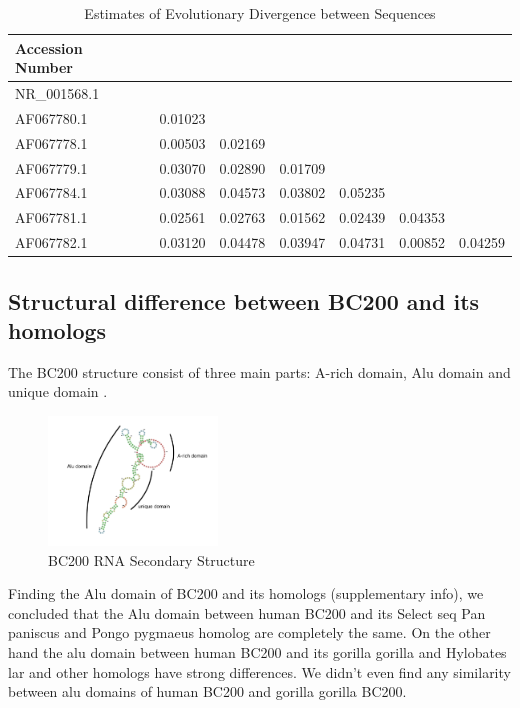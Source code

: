 \documentclass[conference, 11pt]{IEEEtran}
\begin{document}
\begin{table}[h]
  \centering
  \caption{Estimates of Evolutionary Divergence between Sequences}
  \label{tbl:distances}
  \begin{tabular}{lcccccc}
    \toprule
    Accession Number \\
    \midrule
    NR\_001568.1 \\
    AF067780.1 & 0.01023 \\
    AF067778.1 & 0.00503 & 0.02169 \\
    AF067779.1 & 0.03070 & 0.02890 & 0.01709 \\ 
    AF067784.1 & 0.03088 & 0.04573 & 0.03802 & 0.05235 \\
    AF067781.1 & 0.02561 & 0.02763 & 0.01562 & 0.02439 & 0.04353 \\ 
    AF067782.1 & 0.03120 & 0.04478 & 0.03947 & 0.04731 & 0.00852 & 0.04259 \\
    \bottomrule
  \end{tabular}
\end{table}

\subsection{Structural difference between BC200 and its homologs}\label{sec:results-structure}

The BC200 structure consist of three main parts: A-rich domain, Alu domain and unique domain \cite{jung2014rna}.

\begin{figure}[h]
  \centering
  \includegraphics[width=0.4\textwidth]{figs/rna-6.png}
  \caption{BC200 RNA Secondary Structure}
  \label{fig:bc200-structure}
\end{figure}

Finding the Alu domain of BC200 and its homologs (supplementary info), we concluded that the Alu domain between human BC200 and its Select seq Pan paniscus and Pongo pygmaeus homolog are completely the same. 
On the other hand the alu domain between human BC200 and its gorilla gorilla and Hylobates lar and other homologs have strong differences. 
We didn't even find any similarity between alu domains of human BC200 and gorilla gorilla BC200.
\end{document}
